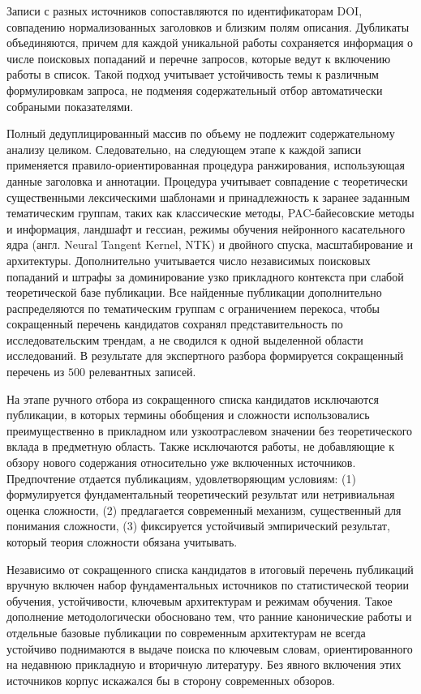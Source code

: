 \documentclass[russian]{intsys}
\begin{document}
Записи с разных источников сопоставляются по идентификаторам DOI, совпадению нормализованных заголовков и близким полям описания.
Дубликаты объединяются, причем для каждой уникальной работы сохраняется информация о числе поисковых попаданий и перечне запросов, которые ведут к включению работы в список.
Такой подход учитывает устойчивость темы к различным формулировкам запроса, не подменяя содержательный отбор автоматически собраными показателями.

Полный дедуплицированный массив по объему не подлежит содержательному анализу целиком.
Следовательно, на следующем этапе к каждой записи применяется правило-ориентированная процедура ранжирования, использующая данные заголовка и аннотации.
Процедура учитывает совпадение с теоретически существенными лексическими шаблонами и принадлежность к заранее заданным тематическим группам, таких как классические методы, PAC-байесовские методы и информация, ландшафт и гессиан, режимы обучения нейронного касательного ядра (англ. Neural Tangent Kernel, NTK) и двойного спуска, масштабирование и архитектуры.
Дополнительно учитывается число независимых поисковых попаданий и штрафы за доминирование узко прикладного контекста при слабой теоретической базе публикации.
Все найденные публикации дополнительно распределяются по тематическим группам с ограничением перекоса, чтобы сокращенный перечень кандидатов сохранял представительность по исследовательским трендам, а не сводился к одной выделенной области исследований.
В результате для экспертного разбора формируется сокращенный перечень из $500$ релевантных записей.

На этапе ручного отбора из сокращенного списка кандидатов исключаются публикации, в которых термины обобщения и сложности использовались преимущественно в прикладном или узкоотраслевом значении без теоретического вклада в предметную область.
Также исключаются работы, не добавляющие к обзору нового содержания относительно уже включенных источников.
Предпочтение отдается публикациям, удовлетворяющим условиям: (1) формулируется фундаментальный теоретический результат или нетривиальная оценка сложности, (2) предлагается современный механизм, существенный для понимания сложности, (3) фиксируется устойчивый эмпирический результат, который теория сложности обязана учитывать.

Независимо от сокращенного списка кандидатов в итоговый перечень публикаций вручную включен набор фундаментальных источников по статистической теории обучения, устойчивости, ключевым архитектурам и режимам обучения.
Такое дополнение методологически обосновано тем, что ранние канонические работы и отдельные базовые публикации по современным архитектурам не всегда устойчиво поднимаются в выдаче поиска по ключевым словам, ориентированного на недавнюю прикладную и вторичную литературу.
Без явного включения этих источников корпус искажался бы в сторону современных обзоров.
\end{document}
